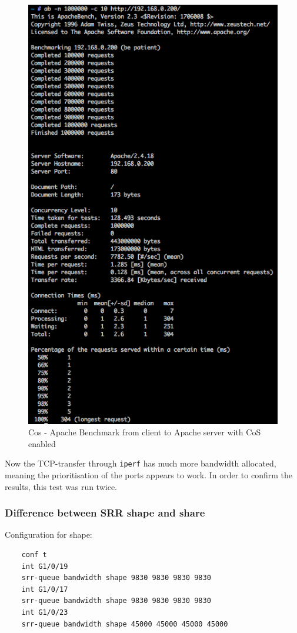 \documentclass{article}
\begin{document}
\begin{figure}[H]
\centering
\includegraphics[width=12cm]{figures/calais-ab2.png}
\caption{Cos - Apache Benchmark from client to Apache server with CoS enabled}
\centering
\label{fig:ab2_calais_scenario_3}
\end{figure}

Now the TCP-transfer through \texttt{iperf} has much more bandwidth allocated, meaning the prioritisation of the ports appears to work. In order to confirm the results, this test was run twice.

\subsubsection{Difference between SRR shape and share}
Configuration for shape:
\begin{verbatim}
    conf t
    int G1/0/19
    srr-queue bandwidth shape 9830 9830 9830 9830
    int G1/0/17
    srr-queue bandwidth shape 9830 9830 9830 9830
    int G1/0/23
    srr-queue bandwidth shape 45000 45000 45000 45000
\end{verbatim}
\end{document}
